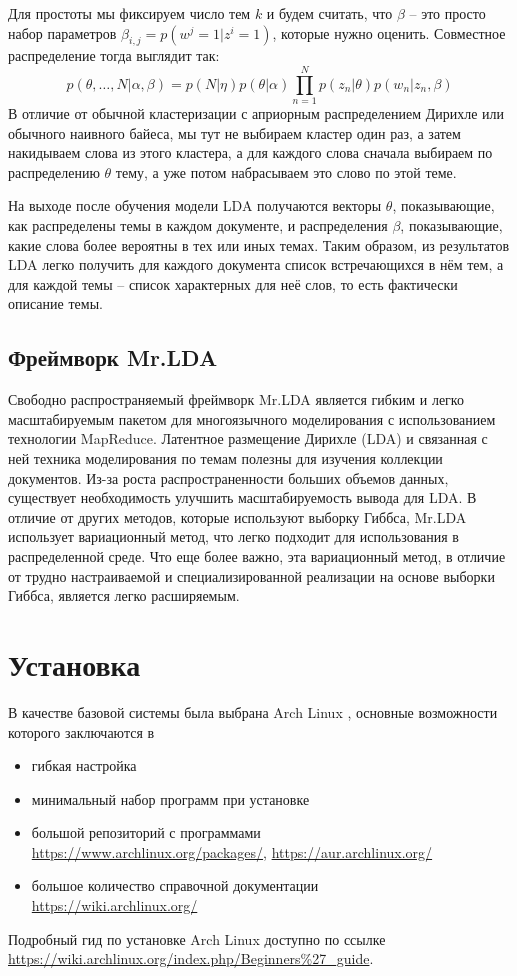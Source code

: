 Для простоты мы фиксируем число тем \( k \) и будем считать, что \( \beta \) -- это просто набор параметров 
\( \beta_{i,j} = p(w^j = 1 | z^i = 1)\), которые нужно оценить. Совместное распределение тогда выглядит так:
\[
    p(\theta,\ldots,N|\alpha,\beta) = 
        p(N|\eta)p(\theta|\alpha)\prod\limits_{n=1}^{N}p(z_n|\theta)p(w_n|z_n,\beta)
\]
В отличие от обычной кластеризации с априорным распределением Дирихле или обычного наивного байеса, мы тут 
не выбираем кластер один раз, а затем накидываем слова из этого кластера, а для каждого слова сначала 
выбираем по распределению \( \theta \) тему, а уже потом набрасываем это слово по этой теме.

На выходе после обучения модели LDA получаются векторы \( \theta \), показывающие, как распределены темы в 
каждом документе, и распределения \( \beta \), показывающие, какие слова более вероятны в тех или иных 
темах. Таким образом, из результатов LDA легко получить для каждого документа список встречающихся в нём 
тем, а для каждой темы -- список характерных для неё слов, то есть фактически описание темы.\cite{lda}

\subsection{Фреймворк Mr.LDA}
Свободно распространяемый фреймворк Mr.LDA \cite{mrldainfo} является гибким и легко масштабируемым пакетом 
для многоязычного моделирования с использованием технологии MapReduce. Латентное размещение Дирихле (LDA) и 
связанная с ней техника моделирования по темам полезны для изучения коллекции документов. Из-за роста 
распространенности больших объемов данных, существует необходимость улучшить масштабируемость вывода для 
LDA. В отличие от других методов, которые используют выборку Гиббса, Mr.LDA использует вариационный метод, 
что легко подходит для использования в распределенной среде. Что еще более важно, эта вариационный метод, в 
отличие от трудно настраиваемой и специализированной реализации на основе выборки Гиббса, является 
легко расширяемым.

\newpage

\section{Установка}
В качестве базовой системы была выбрана Arch Linux \cite{arch}, основные возможности которого заключаются в 
\begin{itemize}
    \item гибкая настройка
    \item минимальный набор программ при установке
    \item большой репозиторий с программами \\
        \url{https://www.archlinux.org/packages/}, \url{https://aur.archlinux.org/}
    \item большое количество справочной документации\\
        \url{https://wiki.archlinux.org/}
\end{itemize}
Подробный гид по установке Arch Linux доступно по ссылке\\
\url{https://wiki.archlinux.org/index.php/Beginners%27_guide}.

